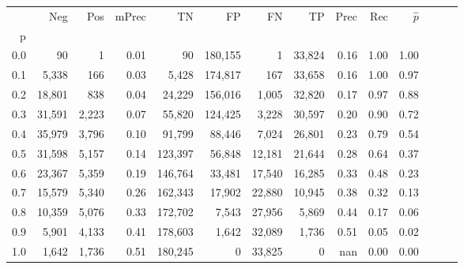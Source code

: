 \begin{tabular}{rrrrrrrrrrrrrr}
\toprule
{} &     Neg &    Pos & mPrec &       TN &       FP &      FN &      TP &  Prec &   Rec & $\hat{p}$ \\
p   &         &        &       &          &          &         &         &       &       &           \\
\midrule
0.0 &      90 &      1 &  0.01 &       90 &  180,155 &       1 &  33,824 &  0.16 &  1.00 &      1.00 \\
0.1 &   5,338 &    166 &  0.03 &    5,428 &  174,817 &     167 &  33,658 &  0.16 &  1.00 &      0.97 \\
0.2 &  18,801 &    838 &  0.04 &   24,229 &  156,016 &   1,005 &  32,820 &  0.17 &  0.97 &      0.88 \\
0.3 &  31,591 &  2,223 &  0.07 &   55,820 &  124,425 &   3,228 &  30,597 &  0.20 &  0.90 &      0.72 \\
0.4 &  35,979 &  3,796 &  0.10 &   91,799 &   88,446 &   7,024 &  26,801 &  0.23 &  0.79 &      0.54 \\
0.5 &  31,598 &  5,157 &  0.14 &  123,397 &   56,848 &  12,181 &  21,644 &  0.28 &  0.64 &      0.37 \\
0.6 &  23,367 &  5,359 &  0.19 &  146,764 &   33,481 &  17,540 &  16,285 &  0.33 &  0.48 &      0.23 \\
0.7 &  15,579 &  5,340 &  0.26 &  162,343 &   17,902 &  22,880 &  10,945 &  0.38 &  0.32 &      0.13 \\
0.8 &  10,359 &  5,076 &  0.33 &  172,702 &    7,543 &  27,956 &   5,869 &  0.44 &  0.17 &      0.06 \\
0.9 &   5,901 &  4,133 &  0.41 &  178,603 &    1,642 &  32,089 &   1,736 &  0.51 &  0.05 &      0.02 \\
1.0 &   1,642 &  1,736 &  0.51 &  180,245 &        0 &  33,825 &       0 &   nan &  0.00 &      0.00 \\
\bottomrule
\end{tabular}
